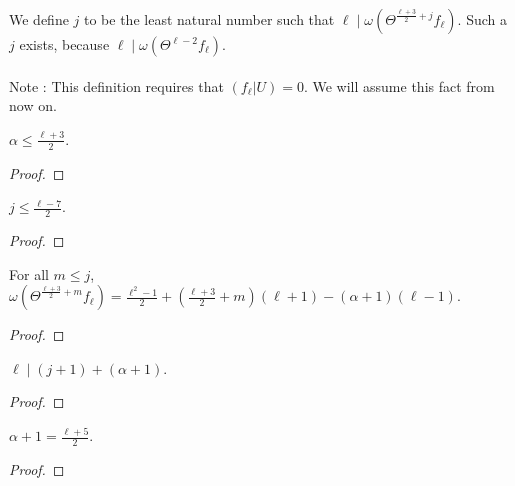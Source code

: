 \begin{definition}
  \label{def:j} 
  \leanok
  We define $j$ to be the least natural number such that
  $\ell \mid \omega (\Theta^{\frac{\ell + 3}{2} + j} f_\ell).$
  Such a $j$ exists, because $\ell \mid \omega (\Theta^{\ell - 2} f_\ell).$ \\ \\
  Note : This definition requires that $(f_\ell | U) = 0.$ We will assume this fact from now on.
\end{definition}


\begin{lemma}
  \label{lem:alpha_bound}
  \leanok
  $\alpha \le \frac{\ell + 3}{2}$.
\end{lemma}
\begin{proof}
  \leanok
\end{proof}

\begin{lemma}
  \label{lem:j_bound}
  \leanok
  $j \le \frac{\ell - 7}{2}$.
\end{lemma}
\begin{proof}
  \leanok
\end{proof}

\begin{lemma}
  \label{lem:Filt_Theta_lej}
  \leanok
  For all $m \le j$, 
  $\omega (\Theta^{\frac{\ell + 3}{2} + m} f_\ell) = 
    \frac{\ell^2 - 1}{2} + (\frac{\ell + 3}{2} + m) (\ell + 1) - (\alpha + 1) (\ell - 1).$
\end{lemma}
\begin{proof}
  \leanok
\end{proof}


\begin{lemma}
  \label{lem:ldiv_j_add_a}
  \leanok
  $\ell \mid (j + 1) + (\alpha + 1)$. 
\end{lemma}
\begin{proof}
  \leanok
\end{proof}

\begin{lemma}
  \label{lem:alpha_equal}
  \leanok
  $\alpha + 1 = \frac{\ell + 5}{2}$.
\end{lemma}
\begin{proof}
  \leanok
\end{proof}

